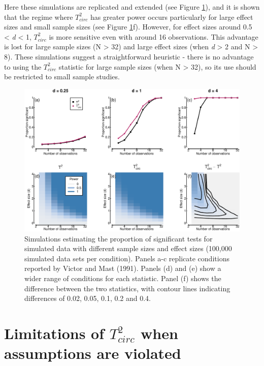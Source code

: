 \documentclass[]{article}
\begin{document}
Here these simulations are replicated and extended (see Figure \ref{fig:powerfig}), and it is shown that the regime where \(T^2_{circ}\) has greater power occurs particularly for large effect sizes and small sample sizes (see Figure \ref{fig:powerfig}f). However, for effect sizes around 0.5 \textless{} \emph{d} \textless{} 1, \(T^2_{circ}\) is more sensitive even with around 16 observations. This advantage is lost for large sample sizes (N \textgreater{} 32) and large effect sizes (when \emph{d} \textgreater{} 2 and N \textgreater{} 8). These simulations suggest a straightforward heuristic - there is no advantage to using the \(T^2_{circ}\) statistic for large sample sizes (when N \textgreater{} 32), so its use should be restricted to small sample studies.

\begin{figure}

{\centering \includegraphics{manuscript_files/figure-latex/powerfig-1} 

}

\caption{Simulations estimating the proportion of significant tests for simulated data with different sample sizes and effect sizes (100,000 simulated data sets per condition). Panels a-c replicate conditions reported by Victor and Mast (1991). Panels (d) and (e) show a wider range of conditions for each statistic. Panel (f) shows the difference between the two statistics, with contour lines indicating differences of 0.02, 0.05, 0.1, 0.2 and 0.4.}\label{fig:powerfig}
\end{figure}

\hypertarget{limitations-of-t2_circ-when-assumptions-are-violated}{%
\section{\texorpdfstring{Limitations of \(T^2_{circ}\) when assumptions are violated}{Limitations of T\^{}2\_\{circ\} when assumptions are violated}}\label{limitations-of-t2_circ-when-assumptions-are-violated}}
\end{document}
